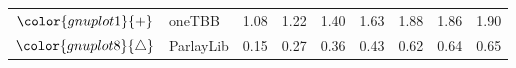 \begin{tabular}{clrrrrrrr}
\rowcolor{gnuplot1!10}$\color{gnuplot1}{+}$ & oneTBB & \cellcolor{gnuplot1!10} 1.08 & \cellcolor{gnuplot1!10} 1.22 & \cellcolor{gnuplot1!10} 1.40 & \cellcolor{gnuplot1!10} 1.63 & \cellcolor{gnuplot1!10} 1.88 & \cellcolor{gnuplot1!10} 1.86 & \cellcolor{gnuplot1!10} 1.90 \\
\rowcolor{gnuplot8!10}$\color{gnuplot8}{\triangle}$ & ParlayLib & \cellcolor{gnuplot8!10} 0.15 & \cellcolor{gnuplot8!10} 0.27 & \cellcolor{gnuplot8!10} 0.36 & \cellcolor{gnuplot8!10} 0.43 & \cellcolor{gnuplot8!10} 0.62 & \cellcolor{gnuplot8!10} 0.64 & \cellcolor{gnuplot8!10} 0.65 \\
\bottomrule
\end{tabular}
